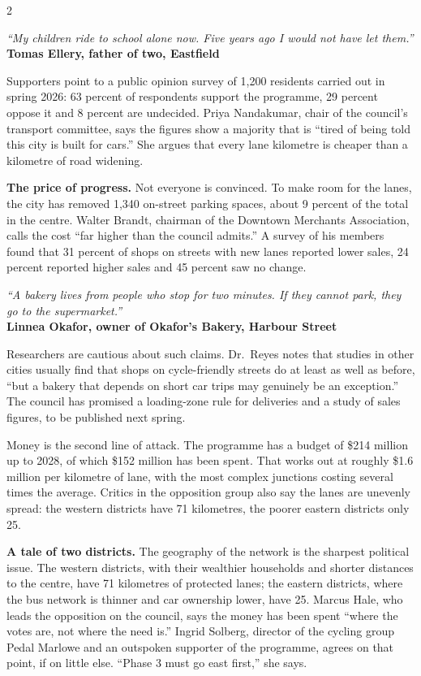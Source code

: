 \documentclass[10pt,a4paper]{article}
\newcommand{\dropquote}[2]{\par\medskip\noindent\begin{tcolorbox}[colback=white, colframe=paperred, boxrule=0pt,
  leftrule=2.5pt, left=7pt, top=3pt, bottom=3pt, sharp corners]
  {\large\itshape #1}\\[2pt]{\sffamily\scriptsize\textbf{#2}}\end{tcolorbox}\medskip}
\begin{document}
\begin{multicols}{2}
\dropquote{``My children ride to school alone now. Five years ago I would not have let them.''}{Tomas Ellery, father of two, Eastfield}

Supporters point to a public opinion survey of 1,200 residents carried out in spring 2026: 63 percent of
respondents support the programme, 29 percent oppose it and 8 percent are undecided. Priya Nandakumar, chair
of the council's transport committee, says the figures show a majority that is ``tired of being told this city
is built for cars.'' She argues that every lane kilometre is cheaper than a kilometre of road widening.


\textbf{The price of progress.} Not everyone is convinced. To make room for the lanes, the city has removed
1,340 on-street parking spaces, about 9 percent of the total in the centre. Walter Brandt, chairman of the
Downtown Merchants Association, calls the cost ``far higher than the council admits.'' A survey of his members
found that 31 percent of shops on streets with new lanes reported lower sales, 24 percent reported higher
sales and 45 percent saw no change.

\dropquote{``A bakery lives from people who stop for two minutes. If they cannot park, they go to the supermarket.''}{Linnea Okafor, owner of Okafor's Bakery, Harbour Street}

Researchers are cautious about such claims. Dr.\ Reyes notes that studies in other cities usually find that
shops on cycle-friendly streets do at least as well as before, ``but a bakery that depends on short car trips
may genuinely be an exception.'' The council has promised a loading-zone rule for deliveries and a study of
sales figures, to be published next spring.

Money is the second line of attack. The programme has a budget of \$214 million up to 2028, of which \$152
million has been spent. That works out at roughly \$1.6 million per kilometre of lane, with the most
complex junctions costing several times the average. Critics in the opposition group also say the lanes
are unevenly spread: the western districts have 71 kilometres, the poorer eastern districts only 25.

\textbf{A tale of two districts.} The geography of the network is the sharpest political issue. The
western districts, with their wealthier households and shorter distances to the centre, have 71 kilometres
of protected lanes; the eastern districts, where the bus network is thinner and car ownership lower, have
25. Marcus Hale, who leads the opposition on the council, says the money has been spent ``where the votes
are, not where the need is.'' Ingrid Solberg, director of the cycling group Pedal Marlowe and an
outspoken supporter of the programme, agrees on that point, if on little else. ``Phase 3 must go east
first,'' she says.


\end{multicols}
\end{document}
